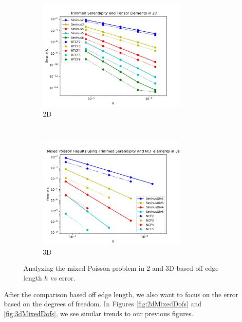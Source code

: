 \documentclass[manuscript,screen]{acmart}
\begin{document}
\begin{figure}[h!]
  \centering
  \begin{subfigure}[h]{0.5\textwidth}
    \centering
    \includegraphics[height=2.2in]{2dMixedPoissonH.pdf}
    \caption{2D}
    \label{fig:2dMixedPoissonH}
  \end{subfigure}
  ~
  \begin{subfigure}[h]{0.5\textwidth}
    \centering
    \includegraphics[height=2.2in]{3dMixedPoissonH.pdf}
    \caption{3D}
    \label{fig:3dMixedPoissonH}
  \end{subfigure}
  \caption{Analyzing the mixed Poisson problem in 2 and 3D based off edge length $h$ vs error.}
\end{figure} 


\newpage

\noindent After the comparison based off edge length, we also want to focus on the error based on the degrees of freedom.  In Figures \ref{fig:2dMixedDofs} and \ref{fig:3dMixedDofs}, we see similar trends to our previous figures.
\end{document}
